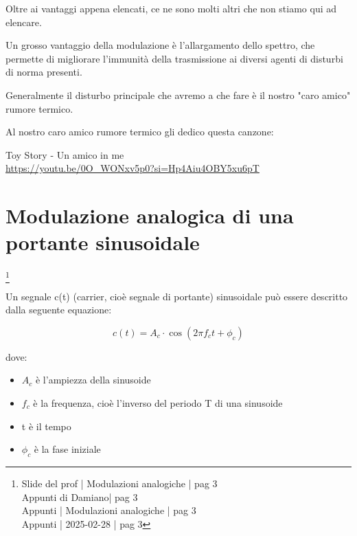 Oltre ai vantaggi appena elencati, ce ne sono molti altri che non stiamo qui ad elencare. \newline 

Un grosso vantaggio della modulazione è l'allargamento dello spettro, che permette di migliorare l'immunità della trasmissione ai diversi agenti di disturbi di norma presenti. \newline 

Generalmente il disturbo principale che avremo a che fare è il nostro "caro amico" rumore termico. \newline 

\begin{tcolorbox}
   Al nostro caro amico rumore termico gli dedico questa canzone: \newline
   
   Toy Story - Un amico in me \\
   \url{https://youtu.be/0O_WONxv5p0?si=Hp4Aiu4OBY5xu6pT}
\end{tcolorbox}

\newpage 

\section{Modulazione analogica di una portante sinusoidale}
\footnote{Slide del prof | Modulazioni analogiche | pag 3 \\  
Appunti di Damiano| pag 3 \\
Appunti | Modulazioni analogiche | pag 3 \\
Appunti | 2025-02-28 | pag 3
} 

Un segnale c(t) (carrier, cioè segnale di portante) sinusoidale può essere descritto dalla seguente equazione: 

{
    \Large 
    \begin{equation}
        c(t) = A_c \cdot \cos(2 \pi f_c t + \phi_c)
    \end{equation}
}

dove: 

\begin{itemize}
    \item $A_c$ è l'ampiezza della sinusoide 
    \item $f_c$ è la frequenza, cioè l'inverso del periodo T di una sinusoide 
    \item t è il tempo 
    \item $\phi_c$ è la fase iniziale
\end{itemize}

